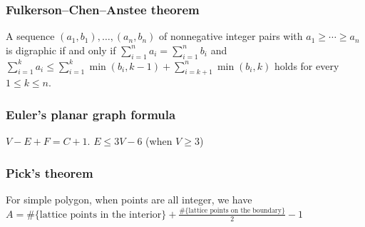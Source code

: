 \subsubsection{Fulkerson–Chen–Anstee theorem}
A sequence $(a_1,b_1),\ldots,(a_n,b_n)$ of nonnegative integer pairs with $a_1\ge\cdots\ge a_n$ is digraphic if and only if $\displaystyle\sum_{i=1}^n a_i=\displaystyle\sum_{i=1}^n b_i$ and $\displaystyle\sum_{i=1}^k a_i\le \displaystyle\sum_{i=1}^k\min(b_i,k-1)+\displaystyle\sum_{i=k+1}^n\min(b_i,k)$ holds for every $1\le k\le n$.


\subsubsection{Euler's planar graph formula}
$V-E+F=C+1$. $E\leq 3V-6$ (when $V\geq 3$)

\subsubsection{Pick's theorem}
For simple polygon, when points are all integer, we have $A=\text{\#\{lattice points in the interior\}} + \frac{\text{\#\{lattice points on the boundary\}}}{2} - 1$


